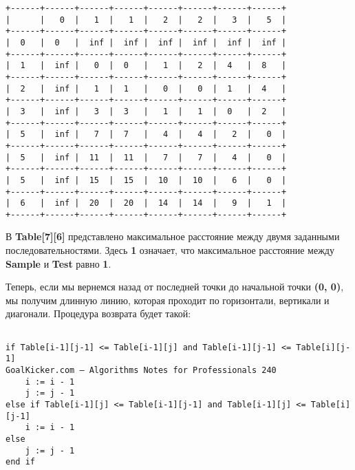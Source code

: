 \vspace{\baselineskip}
\begin{tcolorbox}
\begin{verbatim}
+------+------+------+------+------+------+------+------+
|      |   0  |   1  |   1  |   2  |   2  |   3  |   5  |
+------+------+------+------+------+------+------+------+
|  0   |  0   |  inf |  inf |  inf |  inf |  inf |  inf |
+------+------+------+------+------+------+------+------+
|  1   |  inf |   0  |  0   |   1  |   2  |  4   |  8   |
+------+------+------+------+------+------+------+------+
|  2   |  inf |   1  |  1   |   0  |   0  |  1   |  4   |
+------+------+------+------+------+------+------+------+
|  3   |  inf |   3  |  3   |   1  |   1  |  0   |  2   |
+------+------+------+------+------+------+------+------+
|  5   |  inf |   7  |  7   |   4  |   4  |   2  |   0  |
+------+------+------+------+------+------+------+------+
|  5   |  inf |  11  |  11  |   7  |   7  |   4  |   0  |
+------+------+------+------+------+------+------+------+
|  5   |  inf |  15  |  15  |  10  |  10  |   6  |   0  |
+------+------+------+------+------+------+------+------+
|  6   |  inf |  20  |  20  |  14  |  14  |   9  |   1  |
+------+------+------+------+------+------+------+------+
\end{verbatim}
\end{tcolorbox}

\vspace{\baselineskip}
\vspace{-0.2cm}
В \textbf{Table[7][6]} представлено максимальное расстояние между двумя заданными последовательностями. Здесь \textbf{1} означает, что максимальное расстояние между \textbf{Sample} и \textbf{Test} равно \textbf{1}.

\vspace{\baselineskip}
Теперь, если мы вернемся назад от последней точки до начальной точки \textbf{(0, 0)}, мы получим длинную линию, которая проходит по горизонтали, вертикали и диагонали. Процедура возврата будет такой:

\vspace{\baselineskip}
\begin{tcolorbox}
\begin{verbatim}

if Table[i-1][j-1] <= Table[i-1][j] and Table[i-1][j-1] <= Table[i][j-1]
GoalKicker.com – Algorithms Notes for Professionals 240
	i := i - 1
	j := j - 1
else if Table[i-1][j] <= Table[i-1][j-1] and Table[i-1][j] <= Table[i][j-1]
	i := i - 1
else
	j := j - 1
end if

\end{verbatim}
\end{tcolorbox}

